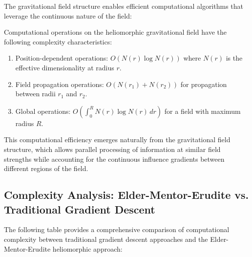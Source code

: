 The gravitational field structure enables efficient computational algorithms that leverage the continuous nature of the field:

\begin{theorem}
Computational operations on the heliomorphic gravitational field have the following complexity characteristics:
\begin{enumerate}
    \item Position-dependent operations: $O(N(r) \log N(r))$ where $N(r)$ is the effective dimensionality at radius $r$.
    \item Field propagation operations: $O(N(r_1) + N(r_2))$ for propagation between radii $r_1$ and $r_2$.
    \item Global operations: $O(\int_0^R N(r) \log N(r) \, dr)$ for a field with maximum radius $R$.
\end{enumerate}
\end{theorem}

This computational efficiency emerges naturally from the gravitational field structure, which allows parallel processing of information at similar field strengths while accounting for the continuous influence gradients between different regions of the field.

\subsection{Complexity Analysis: Elder-Mentor-Erudite vs. Traditional Gradient Descent}

The following table provides a comprehensive comparison of computational complexity between traditional gradient descent approaches and the Elder-Mentor-Erudite heliomorphic approach:

